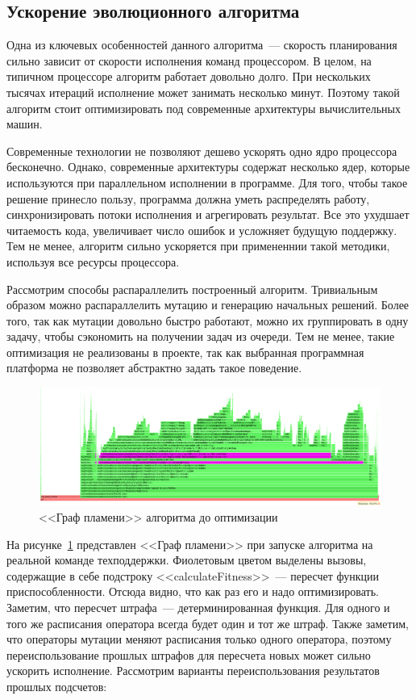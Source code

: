 \documentclass[times,specification,annotation]{itmo-student-thesis}
\begin{document}
\subsection{Ускорение эволюционного алгоритма}

Одна из ключевых особенностей данного алгоритма~--- скорость планирования сильно зависит от скорости исполнения команд процессором.
В целом, на типичном процессоре алгоритм работает довольно долго.
При нескольких тысячах итераций исполнение может занимать несколько минут.
Поэтому такой алгоритм стоит оптимизировать под современные архитектуры вычислительных машин.

Современные технологии не позволяют дешево ускорять одно ядро процессора бесконечно.
Однако, современные архитектуры содержат несколько ядер, которые используются при параллельном исполнении в программе.
Для того, чтобы такое решение принесло пользу, программа должна уметь распределять работу, синхронизировать потоки исполнения и агрегировать результат.
Все это ухудшает читаемость кода, увеличивает число ошибок и усложняет будущую поддержку.
Тем не менее, алгоритм сильно ускоряется при примененнии такой методики, используя все ресурсы процессора.

Рассмотрим способы распараллелить построенный алгоритм.
Тривиальным образом можно распараллелить мутацию и генерацию начальных решений.
Более того, так как мутации довольно быстро работают, можно их группировать в одну задачу, чтобы сэкономить на получении задач из очереди.
Тем не менее, такие оптимизация не реализованы в проекте, так как выбранная программная платформа не позволяет абстрактно задать такое поведение.

\begin{figure}
\caption{<<Граф пламени>> алгоритма до оптимизации}\label{fig2:flame_graph_before_optimization}
\centering
\includegraphics[width=1\columnwidth]{before_optimization_flame.png}
\end{figure}

На рисунке~\ref{fig2:flame_graph_before_optimization} представлен <<Граф пламени>> при запуске алгоритма на реальной команде техподдержки.
Фиолетовым цветом выделены вызовы, содержащие в себе подстроку <<calculateFitness>>~--- пересчет функции приспособленности.
Отсюда видно, что как раз его и надо оптимизировать.
Заметим, что пересчет штрафа~--- детерминированная функция.
Для одного и того же расписания оператора всегда будет один и тот же штраф.
Также заметим, что операторы мутации меняют расписания только одного оператора, поэтому переиспользование прошлых штрафов для пересчета новых может сильно ускорить исполнение.
Рассмотрим варианты переиспользования результатов прошлых подсчетов:
\end{document}
